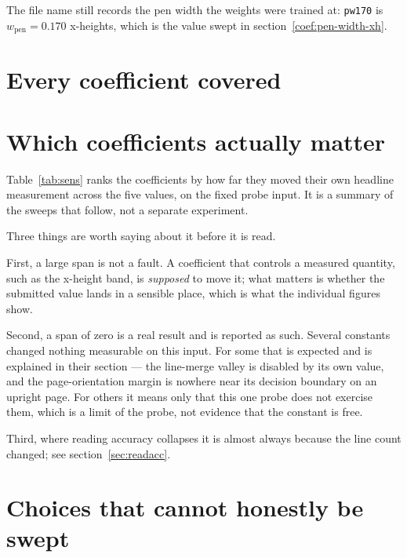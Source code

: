 \documentclass[11pt,a4paper]{article}
\begin{document}
The file name still records the pen width the weights were trained at:
\texttt{pw170} is $w_{\text{pen}} = 0.170$ x-heights, which is the value swept in
section~\ref{coef:pen-width-xh}.

\section{Every coefficient covered}
\label{sec:summary}



\clearpage
\section{Which coefficients actually matter}
\label{sec:sensitivity}

Table~\ref{tab:sens} ranks the coefficients by how far they moved their own
headline measurement across the five values, on the fixed probe input. It is a
summary of the sweeps that follow, not a separate experiment.

Three things are worth saying about it before it is read.

First, a large span is not a fault. A coefficient that controls a measured
quantity, such as the x-height band, is \emph{supposed} to move it; what matters
is whether the submitted value lands in a sensible place, which is what the
individual figures show.

Second, a span of zero is a real result and is reported as such. Several
constants changed nothing measurable on this input. For some that is expected
and is explained in their section --- the line-merge valley is disabled by its
own value, and the page-orientation margin is nowhere near its decision boundary
on an upright page. For others it means only that this one probe does not
exercise them, which is a limit of the probe, not evidence that the constant is
free.

Third, where reading accuracy collapses it is almost always because the line
count changed; see section~\ref{sec:readacc}.

\begin{small}

\end{small}
\label{tab:sens}

\clearpage


\clearpage
\section{Choices that cannot honestly be swept}
\label{sec:arch}
\end{document}
